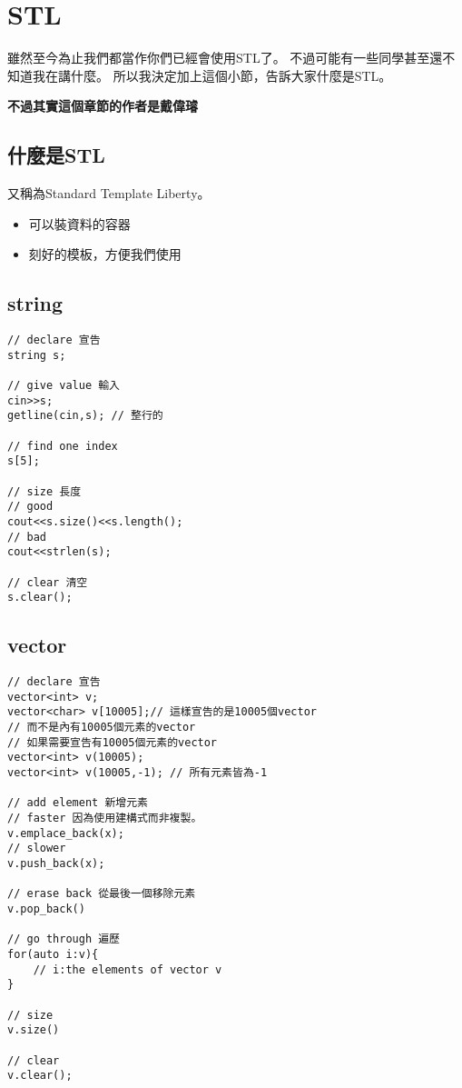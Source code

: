 \section{STL}
    雖然至今為止我們都當作你們已經會使用STL了。
    不過可能有一些同學甚至還不知道我在講什麼。
    所以我決定加上這個小節，告訴大家什麼是STL。

    \textbf{不過其實這個章節的作者是戴偉璿}

    \author{戴偉璿}

    \subsection{什麼是STL}

    又稱為Standard Template Liberty。
    
    \begin{itemize}
        \item 可以裝資料的容器
        \item 刻好的模板，方便我們使用
    \end{itemize}
    
    \subsection{string}

\begin{lstlisting}[caption=string 用法]
// declare 宣告
string s;

// give value 輸入
cin>>s;
getline(cin,s); // 整行的

// find one index
s[5];

// size 長度
// good
cout<<s.size()<<s.length();
// bad
cout<<strlen(s);

// clear 清空
s.clear();
\end{lstlisting}

    \subsection{vector}

\begin{lstlisting}[caption=vector 用法]
// declare 宣告
vector<int> v;
vector<char> v[10005];// 這樣宣告的是10005個vector
// 而不是內有10005個元素的vector
// 如果需要宣告有10005個元素的vector
vector<int> v(10005);
vector<int> v(10005,-1); // 所有元素皆為-1

// add element 新增元素
// faster 因為使用建構式而非複製。
v.emplace_back(x);
// slower
v.push_back(x);

// erase back 從最後一個移除元素
v.pop_back()

// go through 遍歷
for(auto i:v){
    // i:the elements of vector v
}

// size
v.size()
    
// clear
v.clear();
\end{lstlisting}

